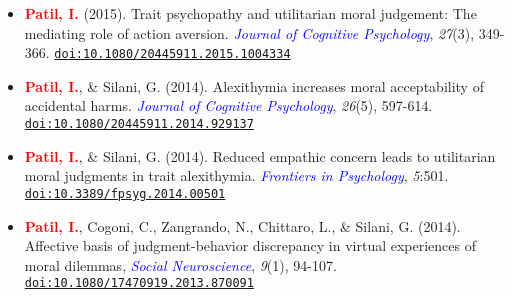 \documentclass[10pt]{article}
\begin{document}
\begin{itemize}
	\item \textbf{\textcolor{red}{Patil, I.}} (2015). Trait psychopathy and utilitarian moral judgement: The mediating role of action aversion. \textit{\textcolor{blue}{Journal of Cognitive Psychology}}, \textit{27}(3), 349-366. \href{https://drive.google.com/file/d/0B6_u70YpdJKnQjVJUFgtR2ZmWTVqZGxRMEFfemVIOUVuME5Z/view?usp=sharing}{\tt doi:10.1080/20445911.2015.1004334}
	
	\item \textbf{\textcolor{red}{Patil, I.}}, \& Silani, G. (2014). Alexithymia increases moral acceptability of accidental harms. \textit{\textcolor{blue}{Journal of Cognitive Psychology}}, \textit{26}(5), 597-614. \href{https://drive.google.com/file/d/0B6_u70YpdJKnMU5pVHRUM3p0SFk/view?usp=sharing}{\tt doi:10.1080/20445911.2014.929137}
	
	\item \textbf{\textcolor{red}{Patil, I.}}, \& Silani, G. (2014). Reduced empathic concern leads to utilitarian moral judgments in trait alexithymia. \textit{\textcolor{blue}{Frontiers in Psychology}}, \textit{5}:501. \href{https://drive.google.com/file/d/0B6_u70YpdJKnUkJZR252dXBwcVk/view?usp=sharing}{\tt doi:10.3389/fpsyg.2014.00501}
	
	\item \textbf{\textcolor{red}{Patil, I.}}, Cogoni, C., Zangrando, N., Chittaro, L., \& Silani, G. (2014). {Affective basis of judgment-behavior discrepancy in virtual experiences of moral dilemmas}, \textit{\textcolor{blue}{Social Neuroscience}}, \textit{9}(1), 94-107. \\
	\href{https://drive.google.com/file/d/0B6_u70YpdJKnV3RIR2s2cWlFdVU/view?usp=sharing}{\tt doi:10.1080/17470919.2013.870091}
	
	\end{itemize}
	
	
	

	
\end{document}
